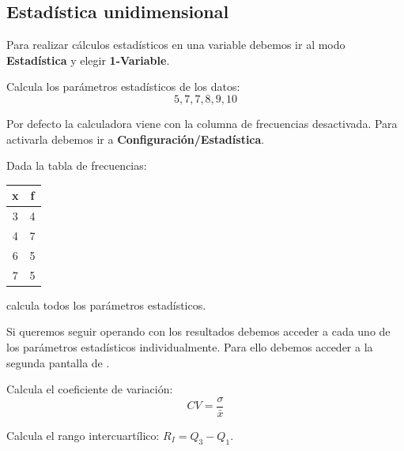 \documentclass[12pt]{article}
\newcommand{\casiosymbol}[1]{{\footnotesize\casio\symbol{#1}}}
\newenvironment{capitulo}{\begin{tcolorbox}[colback=blue!5!white,colframe=red!75!black]}{\end{tcolorbox}\bigskip}
\newenvironment{ejer}{\begin{tcolorbox}[center title, 
fonttitle=\sffamily\bfseries,colback=blue!5,colframe=orange]}{\end{tcolorbox}}
\begin{document}
\begin{capitulo}
\section*{Estadística unidimensional}
\end{capitulo}

Para realizar cálculos estadísticos en una variable debemos ir al modo \textbf{Estadística} y elegir \textbf{1-Variable}.

\begin{ejer}

Calcula los parámetros estadísticos de los datos:
\[
5, 7, 7, 8, 9, 10
\]

\end{ejer}

Por defecto la calculadora viene con la columna de  frecuencias desactivada. Para activarla debemos ir a \textbf{Configuración/Estadística}.

\begin{ejer}

Dada la tabla de frecuencias:
\begin{center}
\begin{tabular}{c|c}
x & f \\ \hline
3 & 4 \\
4 & 7 \\
6 & 5\\
7 & 5
\end{tabular}
\end{center}
calcula todos los parámetros estadísticos.

\end{ejer}

Si queremos seguir operando con los  resultados debemos acceder a cada uno de los parámetros estadísticos individualmente. Para ello debemos acceder a la segunda pantalla de \casiosymbol{84}.

\begin{ejer}

Calcula el coeficiente de variación:
\[
CV = \frac{\sigma}{\bar x}
\]

\end{ejer}

\begin{ejer}

Calcula el rango intercuartílico: $R_I=Q_3 - Q_1$.

\end{ejer}
\end{document}
